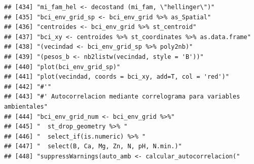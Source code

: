 \documentclass[11pt,]{article}
\begin{document}
\begin{verbatim}
## [434] "mi_fam_hel <- decostand (mi_fam, \"hellinger\")"                                                                                                                       
## [435] "bci_env_grid_sp <- bci_env_grid %>% as_Spatial"                                                                                                                        
## [436] "centroides <- bci_env_grid %>% st_centroid"                                                                                                                            
## [437] "bci_xy <- centroides %>% st_coordinates %>% as.data.frame"                                                                                                             
## [438] "(vecindad <- bci_env_grid_sp %>% poly2nb)"                                                                                                                             
## [439] "(pesos_b <- nb2listw(vecindad, style = 'B'))"                                                                                                                          
## [440] "plot(bci_env_grid_sp)"                                                                                                                                                 
## [441] "plot(vecindad, coords = bci_xy, add=T, col = 'red')"                                                                                                                   
## [442] "#'"                                                                                                                                                                    
## [443] "#' Autocorrelacion mediante correlograma para variables ambientales"                                                                                                   
## [444] "bci_env_grid_num <- bci_env_grid %>%"                                                                                                                                  
## [445] "  st_drop_geometry %>% "                                                                                                                                               
## [446] "  select_if(is.numeric) %>% "                                                                                                                                          
## [447] "  select(B, Ca, Mg, Zn, N, pH, N.min.)"                                                                                                                                
## [448] "suppressWarnings(auto_amb <- calcular_autocorrelacion("                                                                                                                

\end{verbatim}
\end{document}
